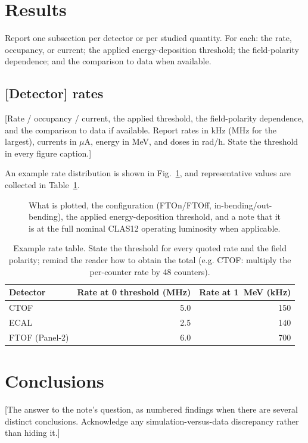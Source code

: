 
\section{Results}
Report one subsection per detector or per studied quantity. For each: the
rate, occupancy, or current; the applied energy-deposition threshold; the
field-polarity dependence; and the comparison to data when available.

\subsection{[Detector] rates}
[Rate / occupancy / current, the applied threshold, the field-polarity
dependence, and the comparison to data if available. Report rates in kHz (MHz for
the largest), currents in $\mu$A, energy in MeV, and doses in rad/h. State the
threshold in every figure caption.]

An example rate distribution is shown in Fig.~\ref{fig:example}, and representative
values are collected in Table~\ref{tab:example}.

\begin{figure}[htbp]
  \centering
  \caption{What is plotted, the configuration (FTOn/FTOff, in-bending/out-bending),
  the applied energy-deposition threshold, and a note that it is at the full nominal
  CLAS12 operating luminosity when applicable.}
  \label{fig:example}
\end{figure}

\begin{table}[htbp]
  \centering
  \begin{tabular}{lrr}
    \toprule
    Detector & Rate at 0 threshold (MHz) & Rate at 1~MeV (kHz) \\
    \midrule
    CTOF & 5.0 & 150 \\
    ECAL & 2.5 & 140 \\
    FTOF (Panel-2) & 6.0 & 700 \\
    \bottomrule
  \end{tabular}
  \caption{Example rate table. State the threshold for every quoted rate and the
  field polarity; remind the reader how to obtain the total (e.g. CTOF: multiply
  the per-counter rate by 48 counters).}
  \label{tab:example}
\end{table}

\section{Conclusions}
[The answer to the note's question, as numbered findings when there are several
distinct conclusions. Acknowledge any simulation-versus-data discrepancy rather
than hiding it.]
